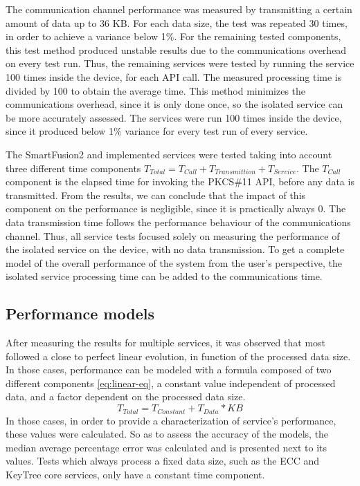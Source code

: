 The communication channel performance was measured by transmitting a certain amount of data up to 36 KB. For each data size, the test was repeated 30 times, in order to achieve a variance below 1\%.
For the remaining tested components, this test method produced unstable results due to the communications overhead on every test run.
Thus, the remaining services were tested by running the service 100 times inside the device, for each API call. The measured processing time is divided by 100 to obtain the average time. This method minimizes the communications overhead, since it is only done once, so the isolated service can be more accurately assessed.
The services were run 100 times inside the device, since it produced below 1\% variance for every test run of every service.

The SmartFusion2 and implemented services were tested taking into account three different time components \(T_{Total} = T_{Call} + T_{Transmittion} + T_{Service}\). The \(T_{Call}\) component is the elapsed time for invoking the PKCS\#11 API, before any data is transmitted. From the results, we can conclude that the impact of this component on the performance is negligible, since it is practically always 0.
The data transmission time follows the performance behaviour of the communications channel.
Thus, all service tests focused solely on measuring the performance of the isolated service on the device, with no data transmission. To get a complete model of the overall performance of the system from the user's perspective, the isolated service processing time can be added to the communications time.

\subsection{Performance models}\label{chap:evaluation:performance:models}

After measuring the results for multiple services, it was observed that most followed a close to perfect linear evolution, in function of the processed data size. In those cases, performance can be modeled with a formula composed of two different components \ref{eq:linear-eq}, a constant value independent of processed data, and a factor dependent on the processed data size.
\begin{equation}
	\label{eq:linear-eq}
	T_{Total} = T_{Constant} + T_{Data} * KB
\end{equation}
In those cases, in order to provide a characterization of service's performance, these values were calculated.
So as to assess the accuracy of the models, the median average percentage error was calculated and is presented next to its values. Tests which always process a fixed data size, such as the ECC and KeyTree core services, only have a constant time component.

